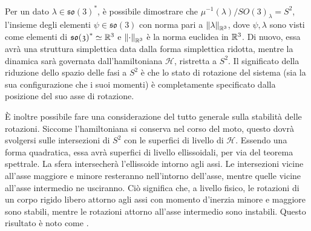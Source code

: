 
Per un dato $\lambda \in \mathfrak{so(3)}^*$, è possibile dimostrare che $\mu^{-1}(\lambda)/SO(3)_{\lambda} = S^2$, l'insieme degli elementi $\psi \in \mathfrak{so(3)}$ con norma pari a $\norm{\lambda}_{\mathbb{R}^3}$, dove $\psi, \lambda$ sono visti come elementi di $\mathfrak{so(3)}^* \simeq \mathbb{R}^3$ e $\norm{\cdot}_{\mathbb{R}^3}$ è la norma euclidea in $\mathbb{R}^3$. Di nuovo, essa avrà una struttura simplettica data dalla forma simplettica ridotta, mentre la dinamica sarà governata dall'hamiltoniana $\mathcal{H}$, ristretta a $S^2$. Il significato della riduzione dello spazio delle fasi a $S^2$ è che lo stato di rotazione del sistema (sia la sua configurazione che i suoi momenti) è completamente specificato dalla posizione del suo asse di rotazione.

È inoltre possibile fare una considerazione del tutto generale sulla stabilità delle rotazioni. Siccome l'hamiltoniana si conserva nel corso del moto, questo dovrà svolgersi sulle intersezioni di $S^2$ con le superfici di livello di $\mathcal{H}$. Essendo una forma quadratica, essa avrà superfici di livello ellissoidali, per via del teorema spettrale. La sfera intersecherà l'ellissoide intorno agli assi. Le intersezioni vicine all'asse maggiore e minore resteranno nell'intorno dell'asse, mentre quelle vicine all'asse intermedio ne usciranno. Ciò significa che, a livello fisico, le rotazioni di un corpo rigido libero attorno agli assi con momento d'inerzia minore e maggiore sono stabili, mentre le rotazioni attorno all'asse intermedio sono instabili. Questo risultato è noto come .